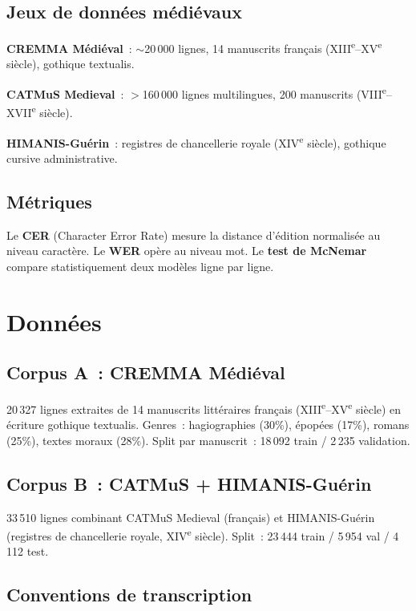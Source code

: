 \documentclass[11pt,a4paper]{article}
\begin{document}
\subsection{Jeux de données médiévaux}

\textbf{CREMMA Médiéval}~: $\sim$20\,000 lignes, 14 manuscrits français (XIII\textsuperscript{e}--XV\textsuperscript{e} siècle), gothique textualis.

\textbf{CATMuS Medieval}~: $>$160\,000 lignes multilingues, 200 manuscrits (VIII\textsuperscript{e}--XVII\textsuperscript{e} siècle).

\textbf{HIMANIS-Guérin}~: registres de chancellerie royale (XIV\textsuperscript{e} siècle), gothique cursive administrative.

\subsection{Métriques}

Le \textbf{CER} (Character Error Rate) mesure la distance d'édition normalisée au niveau caractère. Le \textbf{WER} opère au niveau mot. Le \textbf{test de McNemar} compare statistiquement deux modèles ligne par ligne.

\section{Données}

\subsection{Corpus A~: CREMMA Médiéval}

20\,327 lignes extraites de 14 manuscrits littéraires français (XIII\textsuperscript{e}--XV\textsuperscript{e} siècle) en écriture gothique textualis. Genres~: hagiographies (30\%), épopées (17\%), romans (25\%), textes moraux (28\%). Split par manuscrit~: 18\,092 train / 2\,235 validation.

\subsection{Corpus B~: CATMuS + HIMANIS-Guérin}

33\,510 lignes combinant CATMuS Medieval (français) et HIMANIS-Guérin (registres de chancellerie royale, XIV\textsuperscript{e} siècle). Split~: 23\,444 train / 5\,954 val / 4\,112 test.

\subsection{Conventions de transcription}
\end{document}
